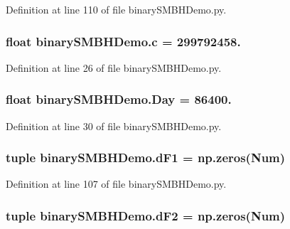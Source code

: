 Definition at line 110 of file binary\-S\-M\-B\-H\-Demo.\-py.

\hypertarget{namespacebinary_s_m_b_h_demo_a8fd5236e1ded5df1f2708d880f1a6c88}{
\subsubsection[{c}]{\setlength{\rightskip}{0pt plus 5cm}float binary\-S\-M\-B\-H\-Demo.\-c = 299792458.}}\label{namespacebinary_s_m_b_h_demo_a8fd5236e1ded5df1f2708d880f1a6c88}


Definition at line 26 of file binary\-S\-M\-B\-H\-Demo.\-py.

\hypertarget{namespacebinary_s_m_b_h_demo_a3027d7c41b68c3e159cd590cfd049a3b}{
\subsubsection[{Day}]{\setlength{\rightskip}{0pt plus 5cm}float binary\-S\-M\-B\-H\-Demo.\-Day = 86400.}}\label{namespacebinary_s_m_b_h_demo_a3027d7c41b68c3e159cd590cfd049a3b}


Definition at line 30 of file binary\-S\-M\-B\-H\-Demo.\-py.

\hypertarget{namespacebinary_s_m_b_h_demo_ab815347908d059a21ee85559443c6f13}{
\subsubsection[{d\-F1}]{\setlength{\rightskip}{0pt plus 5cm}tuple binary\-S\-M\-B\-H\-Demo.\-d\-F1 = np.\-zeros({\bf Num})}}\label{namespacebinary_s_m_b_h_demo_ab815347908d059a21ee85559443c6f13}


Definition at line 107 of file binary\-S\-M\-B\-H\-Demo.\-py.

\hypertarget{namespacebinary_s_m_b_h_demo_acc3053039cda3bee07fd61431f0ff2d6}{
\subsubsection[{d\-F2}]{\setlength{\rightskip}{0pt plus 5cm}tuple binary\-S\-M\-B\-H\-Demo.\-d\-F2 = np.\-zeros({\bf Num})}}\label{namespacebinary_s_m_b_h_demo_acc3053039cda3bee07fd61431f0ff2d6}


